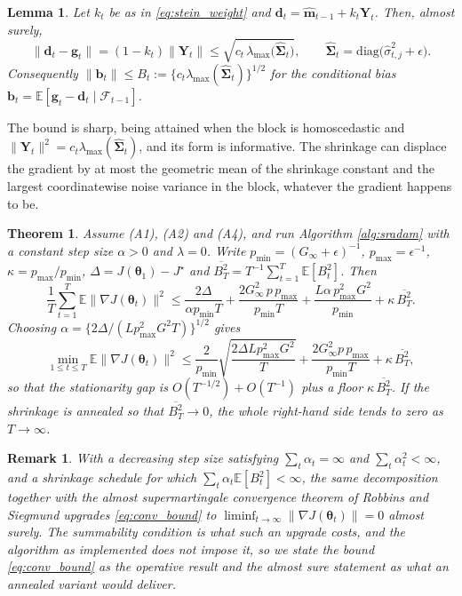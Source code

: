 \documentclass[pdflatex,sn-mathphys-num]{sn-jnl}%
\theoremstyle{thmstyleone}%
\newtheorem{theorem}{Theorem}%
\theoremstyle{thmstyletwo}%
\newtheorem{remark}{Remark}%
\newtheorem{lemma}{Lemma}%
\theoremstyle{thmstylethree}%
\newcommand{\diag}{\mathrm{diag}}
\newcommand{\E}{\mathbb{E}}
\begin{document}
\begin{lemma}
\label{lem:displacement}
Let $k_t$ be as in \eqref{eq:stein_weight} and $\bm d_t=\hat{\bm m}_{t-1}+k_t\bm Y_t$. Then, almost surely,
\begin{equation}
\label{eq:displacement}
\bigl\|\bm d_t-\bm g_t\bigr\|
=
(1-k_t)\|\bm Y_t\|
\le
\sqrt{c_t\,\lambda_{\max}\bigl(\widehat{\bm\Sigma}_t\bigr)},
\qquad
\widehat{\bm\Sigma}_t=\diag\bigl(\hat\sigma^2_{t,j}+\epsilon\bigr).
\end{equation}
Consequently $\|\bm b_t\|\le B_t:=\{c_t\lambda_{\max}(\widehat{\bm\Sigma}_t)\}^{1/2}$ for the conditional bias $\bm b_t=\E[\bm g_t-\bm d_t\mid\mathcal F_{t-1}]$.
\end{lemma}

The bound is sharp, being attained when the block is homoscedastic and $\|\bm Y_t\|^2=c_t\lambda_{\max}(\widehat{\bm\Sigma}_t)$, and its form is informative. The shrinkage can displace the gradient by at most the geometric mean of the shrinkage constant and the largest coordinatewise noise variance in the block, whatever the gradient happens to be.

\begin{theorem}
\label{thm:convergence}
Assume (A1), (A2) and (A4), and run Algorithm \ref{alg:sradam} with a constant step size $\alpha>0$ and $\lambda=0$. Write $p_{\min}=(G_\infty+\epsilon)^{-1}$, $p_{\max}=\epsilon^{-1}$, $\kappa=p_{\max}/p_{\min}$, $\Delta=J(\bm\theta_1)-J^\star$ and $\overline{B^2_T}=T^{-1}\sum_{t=1}^{T}\E[B^2_t]$. Then
\begin{equation}
\label{eq:conv_bound}
\frac1T\sum_{t=1}^{T}\E\bigl\|\nabla J(\bm\theta_t)\bigr\|^{2}
\le
\frac{2\Delta}{\alpha p_{\min}T}
+\frac{2G_\infty^{2}\,p\,p_{\max}}{p_{\min}T}
+\frac{L\alpha\,p^{2}_{\max}G^{2}}{p_{\min}}
+\kappa\,\overline{B^2_T} .
\end{equation}
Choosing $\alpha=\{2\Delta/(Lp^2_{\max}G^2T)\}^{1/2}$ gives
\begin{equation}
\label{eq:conv_rate}
\min_{1\le t\le T}\E\bigl\|\nabla J(\bm\theta_t)\bigr\|^{2}
\le
\frac{2}{p_{\min}}\sqrt{\frac{2\Delta L p^2_{\max}G^2}{T}}
+\frac{2G_\infty^{2}p\,p_{\max}}{p_{\min}T}
+\kappa\,\overline{B^2_T},
\end{equation}
so that the stationarity gap is $O(T^{-1/2})+O(T^{-1})$ plus a floor $\kappa\,\overline{B^2_T}$. If the shrinkage is annealed so that $\overline{B^2_T}\to0$, the whole right-hand side tends to zero as $T\to\infty$.
\end{theorem}

\begin{remark}
With a decreasing step size satisfying $\sum_t\alpha_t=\infty$ and $\sum_t\alpha^2_t<\infty$, and a shrinkage schedule for which $\sum_t\alpha_t\E[B^2_t]<\infty$, the same decomposition together with the almost supermartingale convergence theorem of Robbins and Siegmund \cite{robbins1971} upgrades \eqref{eq:conv_bound} to $\liminf_{t\to\infty}\|\nabla J(\bm\theta_t)\|=0$ almost surely. The summability condition is what such an upgrade costs, and the algorithm as implemented does not impose it, so we state the bound \eqref{eq:conv_bound} as the operative result and the almost sure statement as what an annealed variant would deliver.
\end{remark}
\end{document}
